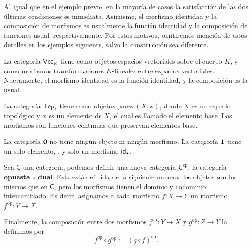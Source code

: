 \documentclass[../main.tex]{subfiles}
\begin{document}
Al igual que en el ejemplo previo, en la mayor\'ia de casos la satisfacci\'on de las dos \'ultimas condiciones es inmediata. Asimismo, el morfismo identidad y la composici\'on de morfismos es usualmente la funci\'on identidad y la composici\'on de funciones usual, respectivamente.
Por estos motivos, omitiremos menci\'on de estos detalles en los ejemplos siguiente, salvo la construcci\'on sea diferente.

\begin{exampleap}
    La categor\'ia $\mathsf{Vec}_K$ tiene como objetos espacios vectoriales sobre el cuerpo $K$, y como morfismos transformaciones $K$-lineales entre espacios vectoriales. Nuevamente, el morfismo identidad es la funci\'on identidad, y la composici\'on es la usual.
\end{exampleap}

\begin{exampleap}
    La categor\'ia $\mathsf{Top}_*$ tiene como objetos pares $(X,x)$, donde $X$ es un espacio topol\'ogico y $x$ es un elemento de $X$, el cual es llamado el elemento base. Los morfismos son funciones continuas que preservan elementos base.
\end{exampleap}

\begin{exampleap}
    La categor\'ia $\emptyt$ no tiene ning\'un objeto ni ning\'un morfismo. La categor\'ia $\unit$ tiene un solo elemento, \star, y solo un morfismo $\idfunc[\star]$.
\end{exampleap}

\begin{exampleap}
    Sea $\mathsf{C}$ una categor\'ia, podemos definir una nueva categor\'ia $\mathsf{C}^{\text{op}}$, la categor\'ia \textbf{opuesta} o \textbf{dual}. Esta est\'a definida de la siguiente manera: los objetos son los mismos que en $\mathsf{C}$, pero los morfismos tienen el dominio y codominio intercambiado. Es decir, asignamos a cada morfismo $f:X \to Y$ un morfismo $f^{\text{op}}:Y \to X$.

    Finalmente, la composici\'on entre dos morfismos $f^{\text{op}}:Y \to X$ y $g^{\text{op}}:Z \to Y$ la definimos por
    \[ f^{\text{op}} \circ g^{\text{op}} := (g\circ f)^{\text{op}}. \]
\end{exampleap}
\end{document}
